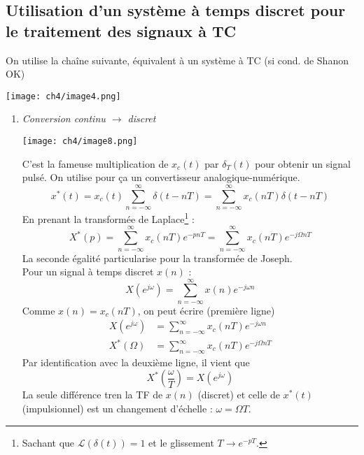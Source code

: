 	\subsection{Utilisation d'un système à temps discret pour le traitement des signaux à TC}
	On utilise la chaîne suivante, équivalent à un système à TC (si cond. de Shanon OK) 
	\begin{center}
	\texttt{[image: ch4/image4.png]}
	\end{center}
	\begin{enumerate}
	\item \textit{Conversion continu $\rightarrow$ discret}
\begin{center}
			\texttt{[image: ch4/image8.png]}
\end{center}
	C'est la fameuse multiplication de $x_c(t)$ par $\delta_T(t)$ pour obtenir un signal pulsé. On 
	utilise pour ça un convertisseur analogique-numérique.
	\begin{equation}
	x^*(t) = x_c(t)\sum_{n=-\infty}^\infty \delta(t-nT) = \sum_{n=-\infty}^\infty x_c(nT)
	\delta(t-nT) 
	\end{equation}
	En prenant la transformée de Laplace\footnote{Sachant que $\mathcal{L}(\delta(t))=1$ et le 
	glissement $T \rightarrow e^{-pT}$.} :
	\begin{equation}
	X^*(p) = \sum_{n=-\infty}^\infty x_c(nT)e^{-pnT} = \sum_{n=-\infty}^\infty x_c(nT)e^{-j\Omega nT}
	\end{equation}
	La seconde égalité particularise pour la transformée de Joseph.\\
	
	Pour un signal à temps discret $x(n)$ :
	\begin{equation}
	X(e^{j\omega}) = \sum_{n=-\infty}^\infty x(n)e^{-j\omega n}
	\end{equation}
	Comme $x(n) = x_c(nT)$, on peut écrire (première ligne)
	\begin{equation}
	\begin{array}{ll}
	X(e^{j\omega}) &= \sum_{n=-\infty}^\infty x_c(nT)e^{-j\omega n}\\
	X^*(\Omega) &= \sum_{n=-\infty}^\infty x_c(nT)e^{-j\Omega nT}
	\end{array}
	\end{equation}
	Par identification avec la deuxième ligne, il vient que
	\begin{equation}
	X^*\left(\frac{\omega}{T}\right) = X(e^{j\omega})
	\end{equation}
	La seule différence tren la TF de $x(n)$ (discret) et celle de $x^*(t)$ (impulsionnel) est 
	un changement d'échelle : $\omega = \Omega T$.
	

\end{enumerate}
